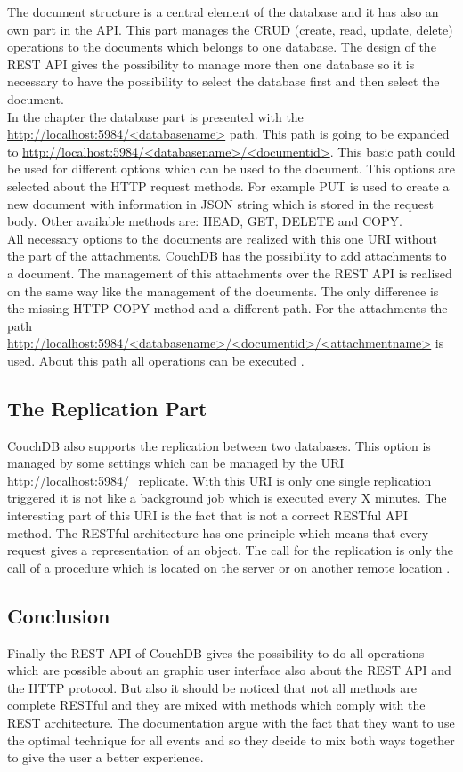 The document structure is a central element of the database and it has also an own part in the API. This part manages the CRUD (create, read, update, delete) operations to the documents which belongs to one database. The design of the REST API gives the possibility to manage more then one database so it is necessary to have the possibility to select the database first and then select the document. \\
In the chapter  the database part is presented with the \url{http://localhost:5984/<databasename>} path. This path is going to be expanded to \url{http://localhost:5984/<databasename>/<documentid>}. This basic path could be used for different options which can be used to the document. This options are selected about the HTTP request methods. For example PUT is used to create a new document with information in JSON string which is stored in the request body. Other available methods are: HEAD, GET, DELETE and COPY.  \\
All necessary options to the documents are realized with this one URI without the part of the attachments. CouchDB has the possibility to add attachments to a document. The management of this attachments over the REST API is realised on the same way like the management of the documents. The only difference is the missing HTTP COPY method and a different path. For the attachments the path \url{http://localhost:5984/<databasename>/<documentid>/<attachmentname>} is used. About this path all operations can be executed \parencite{CouchDBRestDocuments}.

\subsection{The Replication Part}

CouchDB also supports the replication between two databases. This option is managed by some settings which can be managed by the URI \url{http://localhost:5984/_replicate}. With this URI is only one single replication triggered it is not like a background job which is executed every X minutes. The interesting part of this URI is the fact that is not a correct RESTful API method. The RESTful architecture has one principle which means that every request gives a representation of an object. The call for the replication is only the call of a procedure which is located on the server or on another remote location \parencite{CouchDBRestReplication}.

\subsection{Conclusion}

Finally the REST API of CouchDB gives the possibility to do all operations which are possible about an graphic user interface also about the REST API and the HTTP protocol. But also it should be noticed that not all methods are complete RESTful and they are mixed with methods which comply with the REST architecture. 
The documentation argue with the fact that they want to use the optimal technique for all events and so they decide to mix both ways together to give the user a better experience. 

